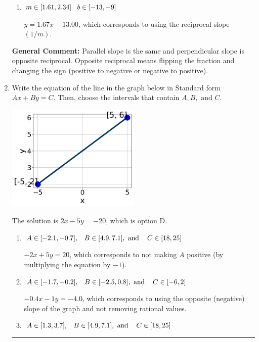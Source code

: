 \documentclass{extbook}[14pt]
\newcommand{\litem}[1]{\item #1

\rule{\textwidth}{0.4pt}}
\begin{document}
\begin{enumerate}
{\begin{enumerate}[label=\Alph*.]
 $y = 0.60x + 13.00$, which corresponds to using the correct slope and getting the negative $y$-intercept.
\item \( m \in [1.61, 2.34] \hspace*{3mm} b \in [-13, -9] \)

 $y = 1.67x - 13.00$, which corresponds to using the reciprocal slope $(1/m)$.
\end{enumerate}

\textbf{General Comment:} Parallel slope is the same and perpendicular slope is opposite reciprocal. Opposite reciprocal means flipping the fraction and changing the sign (positive to negative or negative to positive).
}
\litem{
Write the equation of the line in the graph below in Standard form $Ax+By=C$. Then, choose the intervals that contain $A, B, \text{ and } C$.

\begin{center}
    \includegraphics[width=0.5\textwidth]{../Figures/linearGraphToStandardCopyB.png}
\end{center}


The solution is \( 2x - 5y = -20 \), which is option D.\begin{enumerate}[label=\Alph*.]
\item \( A \in [-2.1, -0.7], \hspace{3mm} B \in [4.9, 7.1], \text{ and } \hspace{3mm} C \in [18, 25] \)

 $-2x + 5y = 20$, which corresponds to not making $A$ positive (by multiplying the equation by $-1$).
\item \( A \in [-1.7, -0.2], \hspace{3mm} B \in [-2.5, 0.8], \text{ and } \hspace{3mm} C \in [-6, 2] \)

 $-0.4x - 1y = -4.0$, which corresponds to using the opposite (negative) slope of the graph and not removing rational values.
\item \( A \in [1.3, 3.7], \hspace{3mm} B \in [4.9, 7.1], \text{ and } \hspace{3mm} C \in [18, 25] \)


\end{enumerate}}
\end{enumerate}
\end{document}
